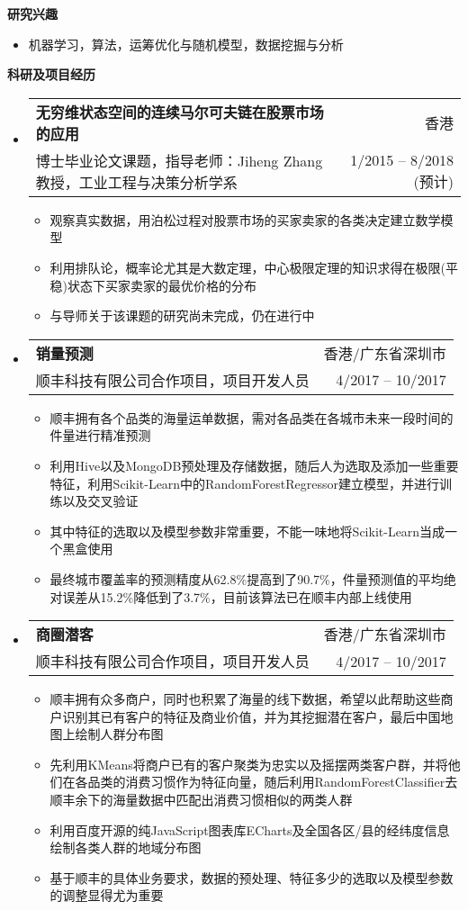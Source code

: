 \documentclass[letterpaper,9pt]{ctexart}
\makeatletter
\newcommand{\resitem}[1]{\item #1 \vspace{-2pt}}
\newcommand{\resheading}[1]{{\large \colorbox{mygrey}{\begin{minipage}{\textwidth}{\textbf{#1 \vphantom{p\^{E}}}}\end{minipage}}}}
\newcommand{\ressubheading}[4]{
\begin{tabular*}{6.5in}{l@{\extracolsep{\fill}}r}
    \textbf{#1} & #2 \\
    #3 & #4 \\
\end{tabular*}\vspace{-6pt}}
\makeatother
\begin{document}
\resheading{研究兴趣}
\begin{itemize}
\item 机器学习，算法，运筹优化与随机模型，数据挖掘与分析
\end{itemize}


\resheading{科研及项目经历}
\begin{itemize}
\item
\ressubheading{无穷维状态空间的连续马尔可夫链在股票市场的应用}{香港}{博士毕业论文课题，指导老师：Jiheng Zhang教授，工业工程与决策分析学系}{1/2015 -- 8/2018 (预计)}
\begin{itemize}
\resitem{观察真实数据，用泊松过程对股票市场的买家卖家的各类决定建立数学模型}
\resitem{利用排队论，概率论尤其是大数定理，中心极限定理的知识求得在极限(平稳)状态下买家卖家的最优价格的分布}
\resitem{与导师关于该课题的研究尚未完成，仍在进行中}
\end{itemize}


\item 
\ressubheading{销量预测}{香港/广东省深圳市}{顺丰科技有限公司合作项目，项目开发人员}{4/2017 -- 10/2017}
\begin{itemize}
\resitem{顺丰拥有各个品类的海量运单数据，需对各品类在各城市未来一段时间的件量进行精准预测}
\resitem{利用Hive以及MongoDB预处理及存储数据，随后人为选取及添加一些重要特征，利用Scikit-Learn中的RandomForestRegressor建立模型，并进行训练以及交叉验证}
\resitem{其中特征的选取以及模型参数非常重要，不能一味地将Scikit-Learn当成一个黑盒使用}
\resitem{最终城市覆盖率的预测精度从62.8\%提高到了90.7\%，件量预测值的平均绝对误差从15.2\%降低到了3.7\%，目前该算法已在顺丰内部上线使用}
\end{itemize}


\item 
\ressubheading{商圈潜客}{香港/广东省深圳市}{顺丰科技有限公司合作项目，项目开发人员}{4/2017 -- 10/2017}
\begin{itemize}
\resitem{顺丰拥有众多商户，同时也积累了海量的线下数据，希望以此帮助这些商户识别其已有客户的特征及商业价值，并为其挖掘潜在客户，最后中国地图上绘制人群分布图}
\resitem{先利用KMeans将商户已有的客户聚类为忠实以及摇摆两类客户群，并将他们在各品类的消费习惯作为特征向量，随后利用RandomForestClassifier去顺丰余下的海量数据中匹配出消费习惯相似的两类人群}
\resitem{利用百度开源的纯JavaScript图表库ECharts及全国各区/县的经纬度信息绘制各类人群的地域分布图}
\resitem{基于顺丰的具体业务要求，数据的预处理、特征多少的选取以及模型参数的调整显得尤为重要}
\end{itemize}



\end{itemize}
\end{document}

